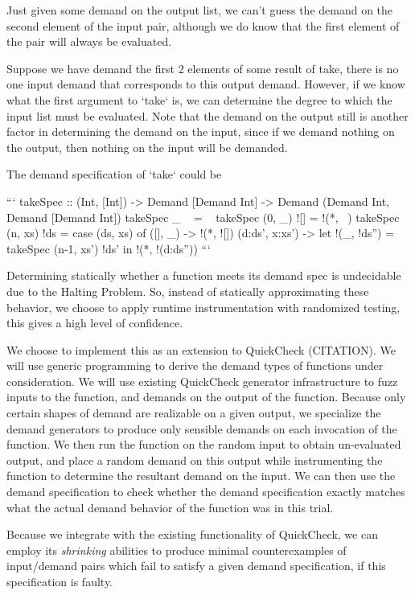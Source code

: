 \documentclass{article}
\begin{document}
Just given some demand on the output list, we can't guess the demand
on the second element of the input pair, although we do know that the
first element of the pair will always be evaluated.

Suppose we have demand the first 2 elements of some result of take,
there is no one input demand that corresponds to this output
demand. However, if we know what the first argument to `take` is, we
can determine the degree to which the input list must be
evaluated. Note that the demand on the output still is another factor
in determining the demand on the input, since if we demand nothing on
the output, then nothing on the input will be demanded.

The demand specification of `take` could be

```
takeSpec :: (Int, [Int]) -> Demand [Demand Int] -> Demand (Demand Int, Demand [Demand Int])
takeSpec _       ~    =  ~
takeSpec (0, _)  ![]  =  !(*, ~)
takeSpec (n, xs) !ds  =
  case (ds, xs) of
    ([],     _)    -> !(*, ![])
    (d:ds', x:xs') ->
      let !(_, !ds'') = takeSpec (n-1, xs') !ds' in
      !(*, !(d:ds''))
```

Determining statically whether a function meets its demand spec is
undecidable due to the Halting Problem. So, instead of statically
approximating these behavior, we choose to apply runtime
instrumentation with randomized testing, this gives a high level of
confidence.

We choose to implement this as an extension to QuickCheck
(CITATION). We will use generic programming to derive the demand types
of functions under consideration. We will use existing QuickCheck
generator infrastructure to fuzz inputs to the function, and demands
on the output of the function. Because only certain shapes of demand
are realizable on a given output, we specialize the demand generators
to produce only sensible demands on each invocation of the
function. We then run the function on the random input to obtain
un-evaluated output, and place a random demand on this output while
instrumenting the function to determine the resultant demand on the
input. We can then use the demand specification to check whether the
demand specification exactly matches what the actual demand behavior
of the function was in this trial.

Because we integrate with the existing functionality of QuickCheck, we
can employ its \emph{shrinking} abilities to produce minimal
counterexamples of input/demand pairs which fail to satisfy a given
demand specification, if this specification is faulty.
\end{document}
